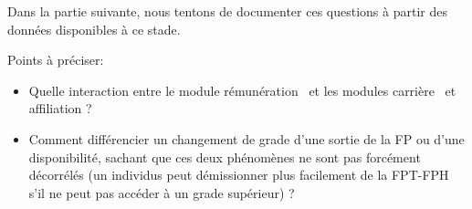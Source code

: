 \documentclass[11pt,a4paper]{article}
\begin{document}
Dans la partie suivante, nous tentons de documenter ces questions à partir des données disponibles à ce stade. 



\vspace{0.5cm}
Points à préciser: 
\begin{itemize}[leftmargin=1cm ,parsep=0cm,itemsep=0cm,topsep=0cm] 
\item Quelle interaction entre le module \og rémunération \fg\ et les modules \og carrière \fg\ et \og affiliation \fg ?  
\item Comment différencier un changement de grade d'une sortie de la FP ou d'une disponibilité, sachant que ces deux phénomènes ne sont pas forcément décorrélés (un individus peut démissionner plus facilement de la FPT-FPH s'il ne peut pas accéder à un grade supérieur) ? 
\end{itemize}










\ifx\isEmbedded\undefined
\newpage
 

\end{document}
